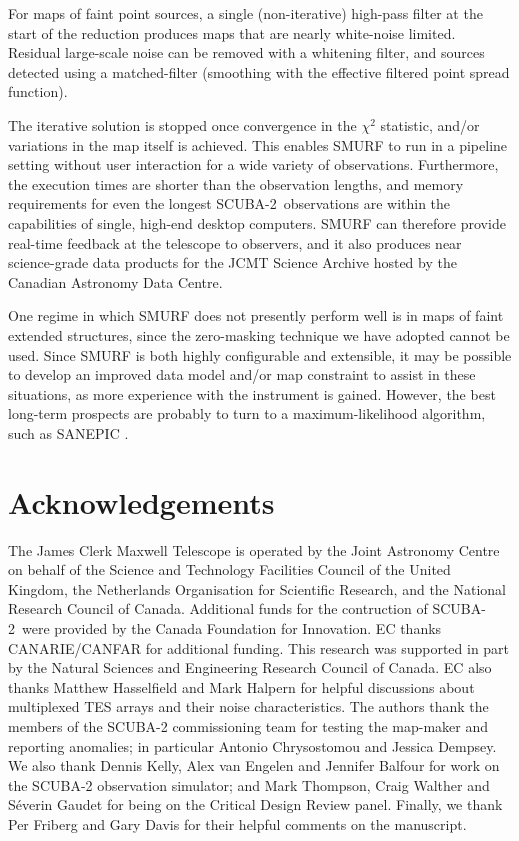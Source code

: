 \documentclass[useAMS,usenatbib,nofootinbib]{mn2e}
\newcommand{\scuba}{SCUBA-2}
\begin{document}
For maps of faint point sources, a single (non-iterative) high-pass
filter at the start of the reduction produces maps that are nearly
white-noise limited. Residual large-scale noise can be removed with a
whitening filter, and sources detected using a matched-filter
(smoothing with the effective filtered point spread function).

The iterative solution is stopped once convergence in the $\chi^2$
statistic, and/or variations in the map itself is achieved. This
enables SMURF to run in a pipeline setting without user interaction
for a wide variety of observations. Furthermore, the execution times
are shorter than the observation lengths, and memory requirements for
even the longest \scuba\ observations are within the capabilities of
single, high-end desktop computers. SMURF can therefore provide real-time
feedback at the telescope to observers, and it also produces near
science-grade data products for the JCMT Science Archive hosted by the
Canadian Astronomy Data Centre.


One regime in which SMURF does not presently perform well is in maps
of faint extended structures, since the zero-masking technique we have
adopted cannot be used. Since SMURF is both highly configurable and
extensible, it may be possible to develop an improved data model
and/or map constraint to assist in these situations, as more
experience with the instrument is gained. However, the best long-term
prospects are probably to turn to a maximum-likelihood algorithm, such
as SANEPIC \citep{patanchon2008}.

\section{Acknowledgements}

The James Clerk Maxwell Telescope is operated by the Joint Astronomy
Centre on behalf of the Science and Technology Facilities Council of
the United Kingdom, the Netherlands Organisation for Scientific
Research, and the National Research Council of Canada. Additional
funds for the contruction of \scuba\ were provided by the Canada
Foundation for Innovation. EC thanks CANARIE/CANFAR for additional
funding. This research was supported in part by the Natural Sciences
and Engineering Research Council of Canada. EC also thanks Matthew
Hasselfield and Mark Halpern for helpful discussions about multiplexed
TES arrays and their noise characteristics.  The authors thank the
members of the SCUBA-2 commissioning team for testing the map-maker
and reporting anomalies; in particular Antonio Chrysostomou and
Jessica Dempsey. We also thank Dennis Kelly, Alex van Engelen and
Jennifer Balfour for work on the SCUBA-2 observation simulator; and
Mark Thompson, Craig Walther and S\'{e}verin Gaudet for being on the
Critical Design Review panel. Finally, we thank Per Friberg and Gary
Davis for their helpful comments on the manuscript.



\end{document}
